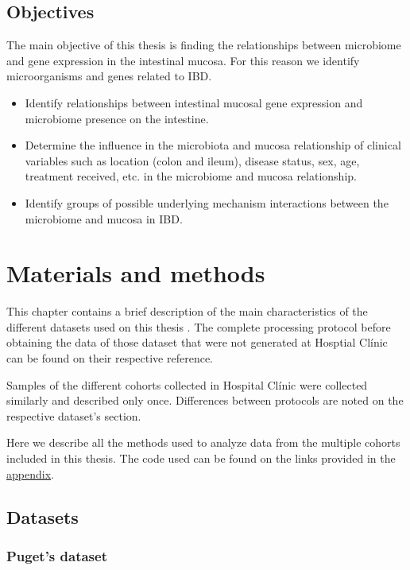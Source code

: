 \documentclass[
  12pt,
  a4paper,
  twoside,
  openright]{book}
\begin{document}
\hypertarget{objectives}{%
\section{Objectives}\label{objectives}}

The main objective of this thesis is finding the relationships between microbiome and gene expression in the intestinal mucosa. For this reason we identify microorganisms and genes related to IBD.

\begin{itemize}
\item
  Identify relationships between intestinal mucosal gene expression and microbiome presence on the intestine.
\item
  Determine the influence in the microbiota and mucosa relationship of clinical variables such as location (colon and ileum), disease status, sex, age, treatment received, etc. in the microbiome and mucosa relationship.
\item
  Identify groups of possible underlying mechanism interactions between the microbiome and mucosa in IBD.
\end{itemize}

\hypertarget{materials-and-methods}{%
\chapter{Materials and methods}\label{materials-and-methods}}

This chapter contains a brief description of the main characteristics of the different datasets used on this thesis .
The complete processing protocol before obtaining the data of those dataset that were not generated at Hosptial Clínic can be found on their respective reference.

Samples of the different cohorts collected in Hospital Clínic were collected similarly and described only once.
Differences between protocols are noted on the respective dataset's section.

Here we describe all the methods used to analyze data from the multiple cohorts included in this thesis.
The code used can be found on the links provided in the \protect\hyperlink{software}{appendix}.

\hypertarget{datasets}{%
\section{Datasets}\label{datasets}}

\hypertarget{methods-puget}{%
\subsection{Puget's dataset}\label{methods-puget}}
\end{document}

